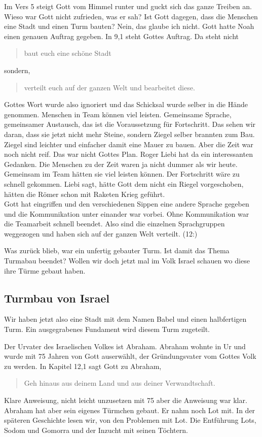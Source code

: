 \documentclass[14pt]{../../inc/mybib}
\newcommand{\q}[1]{\blockquote{#1}}
\begin{document}
    Im Vers 5 steigt Gott vom Himmel runter und guckt sich das ganze Treiben an. Wieso war Gott nicht zufrieden, was er sah? Ist Gott dagegen, dass die Menschen eine Stadt und einen Turm bauten? Nein, das glaube ich nicht. Gott hatte Noah einen genauen Auftrag gegeben. In 9,1 steht Gottes Auftrag. Da steht nicht \q{baut euch eine schöne Stadt} sondern, \q{verteilt euch auf der ganzen Welt und bearbeitet diese.} Gottes Wort wurde also ignoriert und das Schicksal wurde selber in die Hände genommen. Menschen in Team können viel leisten. Gemeinsame Sprache, gemeinsamer Austausch, das ist die Voraussetzung für Fortschritt. Das sehen wir daran, dass sie jetzt nicht mehr Steine, sondern Ziegel selber brannten zum Bau. Ziegel sind leichter und einfacher damit eine Mauer zu bauen. Aber die Zeit war noch nicht reif. Das war nicht Gottes Plan. Roger Liebi hat da ein interessanten Gedanken. Die Menschen zu der Zeit waren ja nicht dummer als wir heute. Gemeinsam im Team hätten sie viel leisten können. Der Fortschritt wäre zu schnell gekommen. Liebi sagt, hätte Gott dem nicht ein Riegel vorgeschoben, hätten die Römer schon mit Raketen Krieg geführt.\\
    Gott hat eingriffen und den verschiedenen Sippen eine andere Sprache gegeben und die Kommunikation unter einander war vorbei. Ohne Kommunikation war die Teamarbeit schnell beendet. Also sind die einzelnen Sprachgruppen weggezogen und haben sich auf der ganzen Welt verteilt. (12:)

    Was zurück blieb, war ein unfertig gebauter Turm. Ist damit das Thema Turmabau beendet? Wollen wir doch jetzt mal im Volk Israel schauen wo diese ihre Türme gebaut haben.
    
    \subsection{Turmbau von Israel}
    Wir haben jetzt also eine Stadt mit dem Namen Babel und einen halbfertigen Turm. Ein ausgegrabenes Fundament wird diesem Turm zugeteilt. 

    Der Urvater des Israelischen Volkes ist Abraham. Abraham wohnte in Ur und wurde mit 75 Jahren von Gott auserwählt, der Gründungsvater vom Gottes Volk zu werden. In Kapitel 12,1 sagt Gott zu Abraham, \q{Geh hinaus aus deinem Land und aus deiner Verwandtschaft.} Klare Anweisung, nicht leicht unzusetzen mit 75 aber die Anweisung war klar. Abraham hat aber sein eigenes Türmchen gebaut. Er nahm noch Lot mit. In der späteren Geschichte lesen wir, von den Problemen mit Lot. Die Entführung Lots, Sodom und Gomorra und der Inzucht mit seinen Töchtern.  
    
\end{document}
